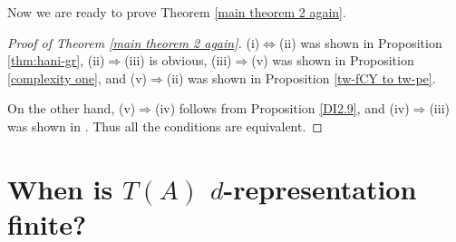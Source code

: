 \documentclass[a4paper,reqno,11pt]{amsart}
\newtheorem{proposition}[theorem]{Proposition}
\theoremstyle{definition}
\newcommand{\CC}{\mathcal{C}}
\newcommand{\Z}{\mathbb{Z}}
\DeclareMathOperator{\add}{\mathsf{add}}
\newcommand{\new}[1]{{\blue #1}}
\numberwithin{equation}{section}
\begin{document}

\new{
Now we are ready to prove Theorem \ref{main theorem 2 again}.

\begin{proof}[Proof of Theorem \ref{main theorem 2 again}]
(i)$\Leftrightarrow$(ii) was shown in Proposition \ref{thm:hani-gr}, (ii)$\Rightarrow$(iii) is obvious, (iii)$\Rightarrow$(v) was shown in Proposition \ref{complexity one}, and (v)$\Rightarrow$(ii) was shown in Proposition \ref{tw-fCY to tw-pe}. 

On the other hand, (v)$\Rightarrow$(iv) follows from Proposition \ref{DI2.9}, and (iv)$\Rightarrow$(iii) was shown in \cite{EH}.
Thus all the conditions are equivalent.
\end{proof}
}




\section{\new{When is $T(A)$ $d$-representation finite?}}
\end{document}
